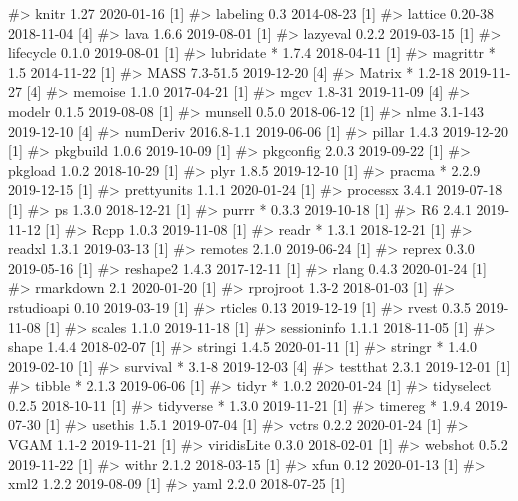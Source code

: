 \documentclass[
]{jss}
\begin{document}
\begin{CodeChunk}
\begin{CodeOutput}
#>  knitr         1.27       2020-01-16 [1]
#>  labeling      0.3        2014-08-23 [1]
#>  lattice       0.20-38    2018-11-04 [4]
#>  lava          1.6.6      2019-08-01 [1]
#>  lazyeval      0.2.2      2019-03-15 [1]
#>  lifecycle     0.1.0      2019-08-01 [1]
#>  lubridate   * 1.7.4      2018-04-11 [1]
#>  magrittr    * 1.5        2014-11-22 [1]
#>  MASS          7.3-51.5   2019-12-20 [4]
#>  Matrix      * 1.2-18     2019-11-27 [4]
#>  memoise       1.1.0      2017-04-21 [1]
#>  mgcv          1.8-31     2019-11-09 [4]
#>  modelr        0.1.5      2019-08-08 [1]
#>  munsell       0.5.0      2018-06-12 [1]
#>  nlme          3.1-143    2019-12-10 [4]
#>  numDeriv      2016.8-1.1 2019-06-06 [1]
#>  pillar        1.4.3      2019-12-20 [1]
#>  pkgbuild      1.0.6      2019-10-09 [1]
#>  pkgconfig     2.0.3      2019-09-22 [1]
#>  pkgload       1.0.2      2018-10-29 [1]
#>  plyr          1.8.5      2019-12-10 [1]
#>  pracma      * 2.2.9      2019-12-15 [1]
#>  prettyunits   1.1.1      2020-01-24 [1]
#>  processx      3.4.1      2019-07-18 [1]
#>  ps            1.3.0      2018-12-21 [1]
#>  purrr       * 0.3.3      2019-10-18 [1]
#>  R6            2.4.1      2019-11-12 [1]
#>  Rcpp          1.0.3      2019-11-08 [1]
#>  readr       * 1.3.1      2018-12-21 [1]
#>  readxl        1.3.1      2019-03-13 [1]
#>  remotes       2.1.0      2019-06-24 [1]
#>  reprex        0.3.0      2019-05-16 [1]
#>  reshape2      1.4.3      2017-12-11 [1]
#>  rlang         0.4.3      2020-01-24 [1]
#>  rmarkdown     2.1        2020-01-20 [1]
#>  rprojroot     1.3-2      2018-01-03 [1]
#>  rstudioapi    0.10       2019-03-19 [1]
#>  rticles       0.13       2019-12-19 [1]
#>  rvest         0.3.5      2019-11-08 [1]
#>  scales        1.1.0      2019-11-18 [1]
#>  sessioninfo   1.1.1      2018-11-05 [1]
#>  shape         1.4.4      2018-02-07 [1]
#>  stringi       1.4.5      2020-01-11 [1]
#>  stringr     * 1.4.0      2019-02-10 [1]
#>  survival    * 3.1-8      2019-12-03 [4]
#>  testthat      2.3.1      2019-12-01 [1]
#>  tibble      * 2.1.3      2019-06-06 [1]
#>  tidyr       * 1.0.2      2020-01-24 [1]
#>  tidyselect    0.2.5      2018-10-11 [1]
#>  tidyverse   * 1.3.0      2019-11-21 [1]
#>  timereg     * 1.9.4      2019-07-30 [1]
#>  usethis       1.5.1      2019-07-04 [1]
#>  vctrs         0.2.2      2020-01-24 [1]
#>  VGAM          1.1-2      2019-11-21 [1]
#>  viridisLite   0.3.0      2018-02-01 [1]
#>  webshot       0.5.2      2019-11-22 [1]
#>  withr         2.1.2      2018-03-15 [1]
#>  xfun          0.12       2020-01-13 [1]
#>  xml2          1.2.2      2019-08-09 [1]
#>  yaml          2.2.0      2018-07-25 [1]

\end{CodeOutput}
\end{CodeChunk}
\end{document}

